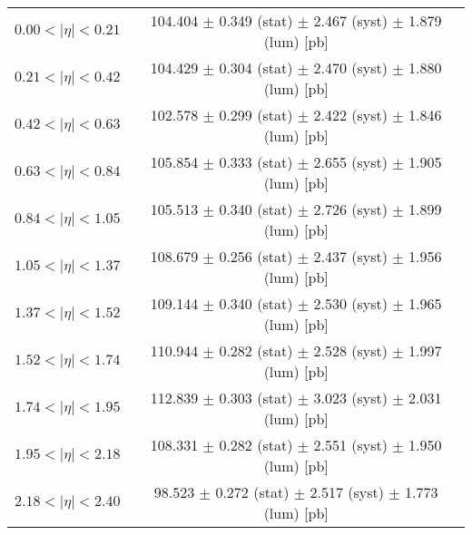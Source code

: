 \begin{tabular}{lc}
\hline
$0.00 < |\eta| <0.21$          & 104.404 $\pm$ 0.349 (stat) $\pm$ 2.467 (syst) $\pm$ 1.879 (lum) [pb]  \\
$0.21 < |\eta| <0.42$          & 104.429 $\pm$ 0.304 (stat) $\pm$ 2.470 (syst) $\pm$ 1.880 (lum) [pb]  \\
$0.42 < |\eta| <0.63$          & 102.578 $\pm$ 0.299 (stat) $\pm$ 2.422 (syst) $\pm$ 1.846 (lum) [pb]  \\
$0.63 < |\eta| <0.84$          & 105.854 $\pm$ 0.333 (stat) $\pm$ 2.655 (syst) $\pm$ 1.905 (lum) [pb]  \\
$0.84 < |\eta| <1.05$          & 105.513 $\pm$ 0.340 (stat) $\pm$ 2.726 (syst) $\pm$ 1.899 (lum) [pb]  \\
$1.05 < |\eta| <1.37$          & 108.679 $\pm$ 0.256 (stat) $\pm$ 2.437 (syst) $\pm$ 1.956 (lum) [pb]  \\
$1.37 < |\eta| <1.52$          & 109.144 $\pm$ 0.340 (stat) $\pm$ 2.530 (syst) $\pm$ 1.965 (lum) [pb]  \\
$1.52 < |\eta| <1.74$          & 110.944 $\pm$ 0.282 (stat) $\pm$ 2.528 (syst) $\pm$ 1.997 (lum) [pb]  \\
$1.74 < |\eta| <1.95$          & 112.839 $\pm$ 0.303 (stat) $\pm$ 3.023 (syst) $\pm$ 2.031 (lum) [pb]  \\
$1.95 < |\eta| <2.18$          & 108.331 $\pm$ 0.282 (stat) $\pm$ 2.551 (syst) $\pm$ 1.950 (lum) [pb]  \\
$2.18 < |\eta| <2.40$          & 98.523 $\pm$ 0.272 (stat) $\pm$ 2.517 (syst) $\pm$ 1.773 (lum) [pb]  \\
\hline
\end{tabular}
